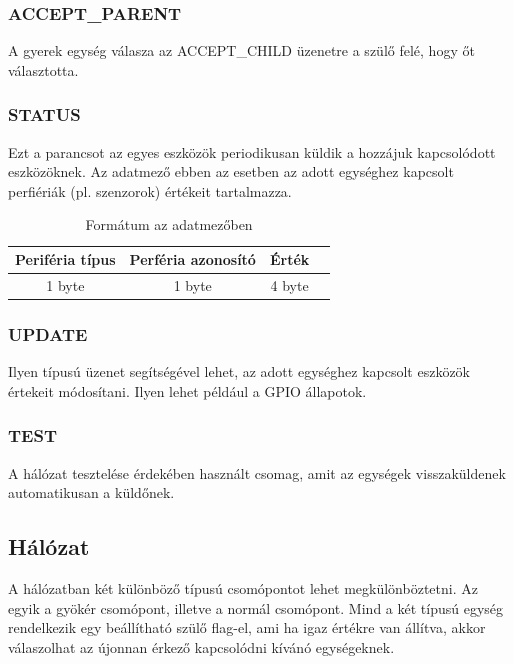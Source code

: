\subsubsection{ACCEPT\_PARENT}
A gyerek egység válasza az ACCEPT\_CHILD üzenetre a szülő felé, hogy őt választotta.
\subsubsection{STATUS}
Ezt a parancsot az egyes eszközök periodikusan küldik a hozzájuk kapcsolódott eszközöknek. Az adatmező ebben az esetben az adott egységhez kapcsolt perfiériák (pl. szenzorok) értékeit tartalmazza. 

\begin{table}[ht]
	\footnotesize
	\centering
	\begin{tabular}{ | c | c | c | c |}
		\toprule
		Periféria típus & Perféria azonosító & Érték \\
		\midrule
        1 byte & 1 byte & 4 byte \\
	\end{tabular}
	\caption{Formátum az adatmezőben}
	\label{tab:TabularExample}
\end{table}

\subsubsection{UPDATE}
Ilyen típusú üzenet segítségével lehet, az adott egységhez kapcsolt eszközök értekeit módosítani. Ilyen lehet például a GPIO állapotok.
\subsubsection{TEST}
A hálózat tesztelése érdekében használt csomag, amit az egységek visszaküldenek automatikusan a küldőnek.


\subsection{Hálózat}
A hálózatban két különböző típusú csomópontot lehet megkülönböztetni. Az egyik a gyökér csomópont, illetve a normál csomópont. Mind a két típusú egység rendelkezik egy beállítható szülő flag-el, ami ha igaz értékre van állítva, akkor válaszolhat az újonnan érkező kapcsolódni kívánó egységeknek.

